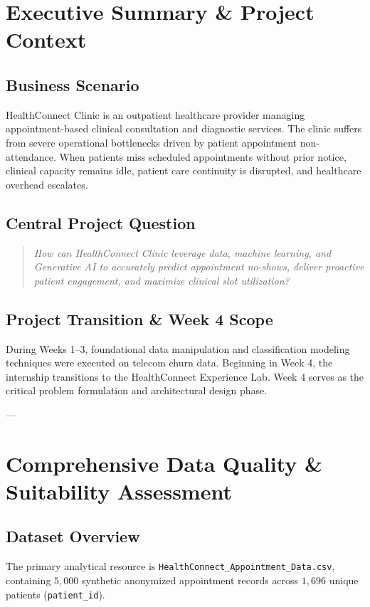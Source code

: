 \documentclass[11pt,a4paper]{article}
\begin{document}
\newpage
\tableofcontents
\newpage

\section{Executive Summary \& Project Context}
\subsection{Business Scenario}
HealthConnect Clinic is an outpatient healthcare provider managing appointment-based clinical consultation and diagnostic services. The clinic suffers from severe operational bottlenecks driven by patient appointment non-attendance. When patients miss scheduled appointments without prior notice, clinical capacity remains idle, patient care continuity is disrupted, and healthcare overhead escalates.

\subsection{Central Project Question}
\begin{quote}
\textit{How can HealthConnect Clinic leverage data, machine learning, and Generative AI to accurately predict appointment no-shows, deliver proactive patient engagement, and maximize clinical slot utilization?}
\end{quote}

\subsection{Project Transition \& Week 4 Scope}
During Weeks 1--3, foundational data manipulation and classification modeling techniques were executed on telecom churn data. Beginning in Week 4, the internship transitions to the HealthConnect Experience Lab. Week 4 serves as the critical problem formulation and architectural design phase.

---

\section{Comprehensive Data Quality \& Suitability Assessment}
\subsection{Dataset Overview}
The primary analytical resource is \texttt{HealthConnect\_Appointment\_Data.csv}, containing $5,000$ synthetic anonymized appointment records across $1,696$ unique patients (\texttt{patient\_id}).
\end{document}
